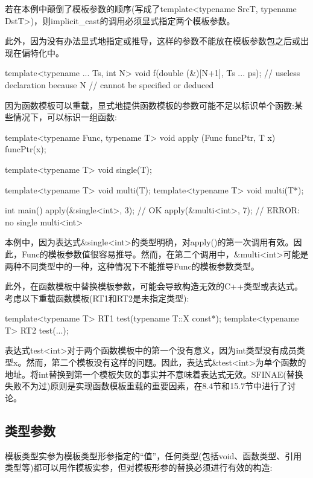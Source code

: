 若在本例中颠倒了模板参数的顺序(写成了template<typename SrcT, typename DstT>)，则implicit\_cast的调用必须显式指定两个模板参数。

此外，因为没有办法显式地指定或推导，这样的参数不能放在模板参数包之后或出现在偏特化中。

\begin{cpp}
template<typename ... Ts, int N>
void f(double (&)[N+1], Ts ... ps); // useless declaration because N
// cannot be specified or deduced
\end{cpp}

因为函数模板可以重载，显式地提供函数模板的参数可能不足以标识单个函数:某些情况下，可以标识一组函数:

\begin{cpp}
template<typename Func, typename T>
void apply (Func funcPtr, T x)
{
	funcPtr(x);
}

template<typename T> void single(T);

template<typename T> void multi(T);
template<typename T> void multi(T*);

int main()
{
	apply(&single<int>, 3); // OK
	apply(&multi<int>, 7); // ERROR: no single multi<int>
}
\end{cpp}

本例中，因为表达式\&single<int>的类型明确，对apply()的第一次调用有效。因此，Func的模板参数值很容易推导。然而，在第二个调用中，\&multi<int>可能是两种不同类型中的一种，这种情况下不能推导Func的模板参数类型。

此外，在函数模板中替换模板参数，可能会导致构造无效的C++类型或表达式。考虑以下重载函数模板(RT1和RT2是未指定类型):

\begin{cpp}
template<typename T> RT1 test(typename T::X const*);
template<typename T> RT2 test(...);
\end{cpp}

表达式test<int>对于两个函数模板中的第一个没有意义，因为int类型没有成员类型x。然而，第二个模板没有这样的问题。因此，表达式\&test<int>为单个函数的地址。将int替换到第一个模板失败的事实并不意味着表达式无效。SFINAE(替换失败不为过)原则是实现函数模板重载的重要因素，在8.4节和15.7节中进行了讨论。

\subsection{类型参数}

模板类型实参为模板类型形参指定的“值”，任何类型(包括void、函数类型、引用类型等)都可以用作模板实参，但对模板形参的替换必须进行有效的构造:

